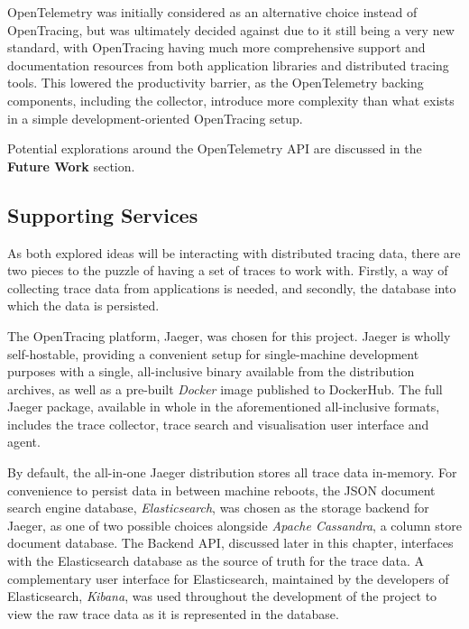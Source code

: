 \documentclass[12pt,pdftex,titlepage]{report}
\begin{document}
                OpenTelemetry was initially considered as an alternative choice instead of OpenTracing, but was ultimately decided against due to it still being a very new
                standard, with OpenTracing having much more comprehensive support and documentation resources from both application libraries and distributed tracing tools.
                This lowered the productivity barrier, as the OpenTelemetry backing components, including the collector, introduce more complexity than what exists in a simple
                development-oriented OpenTracing setup.

                Potential explorations around the OpenTelemetry API are discussed in the \textbf{Future Work} section.

            \subsection{Supporting Services}
                As both explored ideas will be interacting with distributed tracing data, there are two pieces to the puzzle of having a set of traces to work with.
                Firstly, a way of collecting trace data from applications is needed, and secondly, the database into which the data is persisted.
                
                The OpenTracing platform, Jaeger, was chosen for this project. Jaeger is wholly self-hostable, providing a convenient setup for single-machine development purposes with
                a single, all-inclusive binary available from the distribution archives, as well as a pre-built \textit{Docker} image published to DockerHub. The full Jaeger package,
                available in whole in the aforementioned all-inclusive formats, includes the trace collector, trace search and visualisation user interface and agent.

                By default, the all-in-one Jaeger distribution stores all trace data in-memory. For convenience to persist data in between machine reboots, the JSON document search engine
                database, \textit{Elasticsearch}, was chosen as the storage backend for Jaeger, as one of two possible choices alongside \textit{Apache Cassandra}, a column store document
                database. The Backend API, discussed later in this chapter, interfaces with the Elasticsearch database as the source of truth for the trace data. A complementary user interface
                for Elasticsearch, maintained by the developers of Elasticsearch, \textit{Kibana}, was used throughout the development of the project to view the raw trace data as it is 
                represented in the database.
\end{document}
